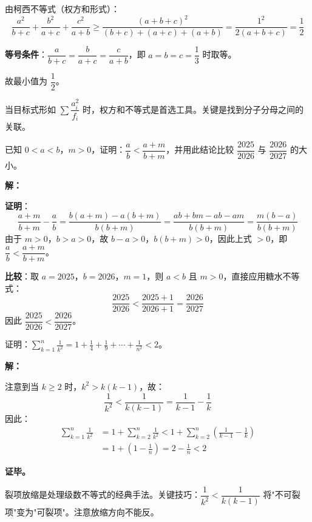 \documentclass[12pt, a4paper]{ctexart}
\begin{document}
由柯西不等式（权方和形式）：
\[
\frac{a^2}{b+c}+\frac{b^2}{a+c}+\frac{c^2}{a+b} \geqslant \frac{(a+b+c)^2}{(b+c)+(a+c)+(a+b)} = \frac{1^2}{2(a+b+c)} = \frac{1}{2}
\]

\textbf{等号条件}：$\dfrac{a}{b+c}=\dfrac{b}{a+c}=\dfrac{c}{a+b}$，即 $a=b=c=\dfrac{1}{3}$ 时取等。

故最小值为 $\boxed{\dfrac{1}{2}}$。

\begin{tipbox}[方法总结]
当目标式形如 $\sum\dfrac{a_i^2}{f_i}$ 时，权方和不等式是首选工具。关键是找到分子分母之间的关联。
\end{tipbox}

\begin{examplebox}[【例题4】糖水不等式的实际应用]
已知 $0 < a < b$，$m > 0$，证明：$\dfrac{a}{b} < \dfrac{a+m}{b+m}$，并用此结论比较 $\dfrac{2025}{2026}$ 与 $\dfrac{2026}{2027}$ 的大小。
\end{examplebox}

\textbf{解：}

\textbf{证明}：
\[
\frac{a+m}{b+m}-\frac{a}{b} = \frac{b(a+m)-a(b+m)}{b(b+m)} = \frac{ab+bm-ab-am}{b(b+m)} = \frac{m(b-a)}{b(b+m)}
\]
由于 $m>0$，$b>a>0$，故 $b-a>0$，$b(b+m)>0$，因此上式 $>0$，即 $\dfrac{a}{b}<\dfrac{a+m}{b+m}$。

\textbf{比较}：取 $a=2025$，$b=2026$，$m=1$，则 $a<b$ 且 $m>0$，直接应用糖水不等式：
\[
\frac{2025}{2026} < \frac{2025+1}{2026+1} = \frac{2026}{2027}
\]
因此 $\dfrac{2025}{2026} < \dfrac{2026}{2027}$。

\begin{examplebox}
证明：$\displaystyle\sum_{k=1}^{n}\frac{1}{k^2} = 1+\frac{1}{4}+\frac{1}{9}+\cdots+\frac{1}{n^2} < 2$。
\end{examplebox}

\textbf{解：}

注意到当 $k \geqslant 2$ 时，$k^2 > k(k-1)$，故：
\[
\frac{1}{k^2} < \frac{1}{k(k-1)} = \frac{1}{k-1}-\frac{1}{k}
\]
因此：
\begin{align*}
\sum_{k=1}^{n}\frac{1}{k^2} &= 1 + \sum_{k=2}^{n}\frac{1}{k^2} < 1 + \sum_{k=2}^{n}\left(\frac{1}{k-1}-\frac{1}{k}\right) \\
&= 1 + \left(1-\frac{1}{n}\right) = 2-\frac{1}{n} < 2
\end{align*}

\textbf{证毕。}

\begin{tipbox}[方法总结]
裂项放缩是处理级数不等式的经典手法。关键技巧：$\dfrac{1}{k^2} < \dfrac{1}{k(k-1)}$ 将"不可裂项"变为"可裂项"。注意放缩方向不能反。
\end{tipbox}
\end{document}
